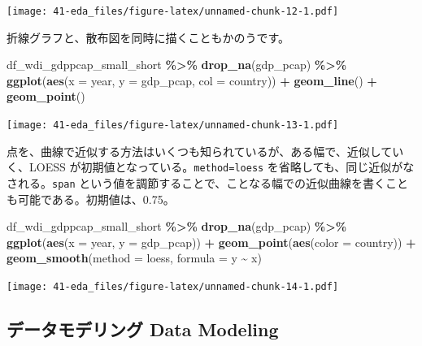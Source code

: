 \documentclass[
  xelatex, ja=standard]{bxjsbook}
\newenvironment{Shaded}{\begin{snugshade}}{\end{snugshade}}
\newcommand{\AttributeTok}[1]{\textcolor[rgb]{0.13,0.29,0.53}{#1}}
\newcommand{\FunctionTok}[1]{\textcolor[rgb]{0.13,0.29,0.53}{\textbf{#1}}}
\newcommand{\NormalTok}[1]{#1}
\newcommand{\SpecialCharTok}[1]{\textcolor[rgb]{0.81,0.36,0.00}{\textbf{#1}}}
\newcommand{\StringTok}[1]{\textcolor[rgb]{0.31,0.60,0.02}{#1}}
\theoremstyle{definition}
\theoremstyle{definition}
\theoremstyle{definition}
\theoremstyle{definition}
\theoremstyle{remark}
\begin{document}
\texttt{[image: 41-eda\_files/figure-latex/unnamed-chunk-12-1.pdf]}

折線グラフと、散布図を同時に描くこともかのうです。

\begin{Shaded}
\begin{Highlighting}[]
\NormalTok{df\_wdi\_gdppcap\_small\_short }\SpecialCharTok{\%\textgreater{}\%} \FunctionTok{drop\_na}\NormalTok{(gdp\_pcap) }\SpecialCharTok{\%\textgreater{}\%}
  \FunctionTok{ggplot}\NormalTok{(}\FunctionTok{aes}\NormalTok{(}\AttributeTok{x =}\NormalTok{ year, }\AttributeTok{y =}\NormalTok{ gdp\_pcap, }\AttributeTok{col =}\NormalTok{ country)) }\SpecialCharTok{+} \FunctionTok{geom\_line}\NormalTok{() }\SpecialCharTok{+}
  \FunctionTok{geom\_point}\NormalTok{()}
\end{Highlighting}
\end{Shaded}

\texttt{[image: 41-eda\_files/figure-latex/unnamed-chunk-13-1.pdf]}

点を、曲線で近似する方法はいくつも知られているが、ある幅で、近似していく、LOESS が初期値となっている。\texttt{method=\textquotesingle{}loess\textquotesingle{}} を省略しても、同じ近似がなされる。\texttt{span} という値を調節することで、ことなる幅での近似曲線を書くことも可能である。初期値は、0.75。

\begin{Shaded}
\begin{Highlighting}[]
\NormalTok{df\_wdi\_gdppcap\_small\_short }\SpecialCharTok{\%\textgreater{}\%} \FunctionTok{drop\_na}\NormalTok{(gdp\_pcap) }\SpecialCharTok{\%\textgreater{}\%}
  \FunctionTok{ggplot}\NormalTok{(}\FunctionTok{aes}\NormalTok{(}\AttributeTok{x =}\NormalTok{ year, }\AttributeTok{y =}\NormalTok{ gdp\_pcap)) }\SpecialCharTok{+} 
  \FunctionTok{geom\_point}\NormalTok{(}\FunctionTok{aes}\NormalTok{(}\AttributeTok{color =}\NormalTok{ country)) }\SpecialCharTok{+} 
  \FunctionTok{geom\_smooth}\NormalTok{(}\AttributeTok{method =} \StringTok{\textquotesingle{}loess\textquotesingle{}}\NormalTok{, }\AttributeTok{formula =} \StringTok{\textquotesingle{}y \textasciitilde{} x\textquotesingle{}}\NormalTok{)}
\end{Highlighting}
\end{Shaded}

\texttt{[image: 41-eda\_files/figure-latex/unnamed-chunk-14-1.pdf]}

\hypertarget{ux30c7ux30fcux30bfux30e2ux30c7ux30eaux30f3ux30b0-data-modeling}{%
\subsection{データモデリング Data Modeling}\label{ux30c7ux30fcux30bfux30e2ux30c7ux30eaux30f3ux30b0-data-modeling}}
\end{document}
